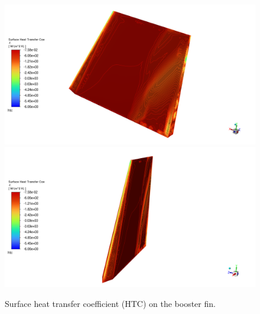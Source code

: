\documentclass[12pt]{article}
\begin{document}
\begin{figure}[H] %
    \centering
    \includegraphics[width=0.495\linewidth]{figs/t136s/t136s_M5p26_jetONVernierON_FIN-HTC.png}
    \includegraphics[width=0.495\linewidth]{figs/t136s/t136s_M5p26_jetONVernierON_FIN2-HTC.png}
    \caption{Surface heat transfer coefficient (HTC) on the booster fin.}
    \label{fig:t136s_fin_htc_onon}
\end{figure}
\end{document}
